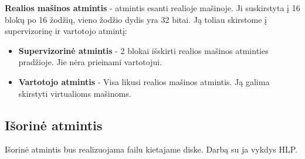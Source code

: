 	\textbf{Realios mašinos atmintis} - atmintis esanti realioje mašinoje. Ji suskirstyta į 16 blokų po 16 žodžių, vieno žodžio dydis yra 32 bitai. Ją toliau skirstome į supervizorinę ir vartotojo atmintį:
	\begin{itemize}
	\item \textbf{Supervizorinė atmintis} - 2 blokai išskirti realios mašinos atminties pradžioje. Jie nėra prieinami vartotojui.
	\item \textbf{Vartotojo atmintis} - Visa likusi realios mašinos atmintis. Ją galima skirstyti virtualioms mašinoms.
	\end{itemize}
	
	\subsection{Išorinė atmintis}
	Išorinė atmintis bus realizuojama failu kietajame diske. Darbą su ja vykdys HLP.
\clearpage